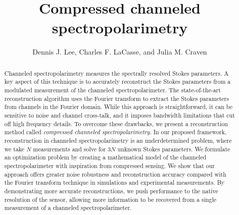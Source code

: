 \documentclass[10pt]{article}
\numberwithin{equation}{subsection}
\begin{document}
\newcommand*{\vertbar}{\rule[-1ex]{0.5pt}{2.5ex}}
\newcommand*{\horzbar}{\rule[.5ex]{2.5ex}{0.5pt}}

\title{Compressed channeled spectropolarimetry}

\author{Dennis J. Lee, Charles F. LaCasse, and Julia M. Craven}

\address{Sandia National Laboratories, 1515 Eubank Blvd. SE, Albuquerque, NM 87123, USA}


\begin{abstract}
    Channeled spectropolarimetry measures the spectrally resolved Stokes parameters.
A key aspect of this technique is to accurately reconstruct the Stokes parameters from a modulated measurement of the channeled spectropolarimeter.
    The state-of-the-art reconstruction algorithm uses the Fourier transform to extract the Stokes parameters from channels in the Fourier domain.
While this approach is straightforward, it can be sensitive to noise and channel cross-talk, and it imposes bandwidth limitations that cut off high frequency details.
    To overcome these drawbacks, we present a reconstruction method called \emph{compressed channeled spectropolarimetry}.
    In our proposed framework, reconstruction in channeled spectropolarimetry is an underdetermined problem, where we take $N$ measurements and solve for $3 N$ unknown Stokes parameters.
    We formulate an optimization problem by creating a mathematical model of the channeled spectropolarimeter with inspiration from compressed sensing.
    We show that our approach offers greater noise robustness and reconstruction accuracy compared with the Fourier transform technique in simulations and experimental measurements.
    By demonstrating more accurate reconstructions, we push performance to the native resolution of the sensor, allowing more information to be recovered from a single measurement of a channeled spectropolarimeter.
\end{abstract}


% 

\end{document}
